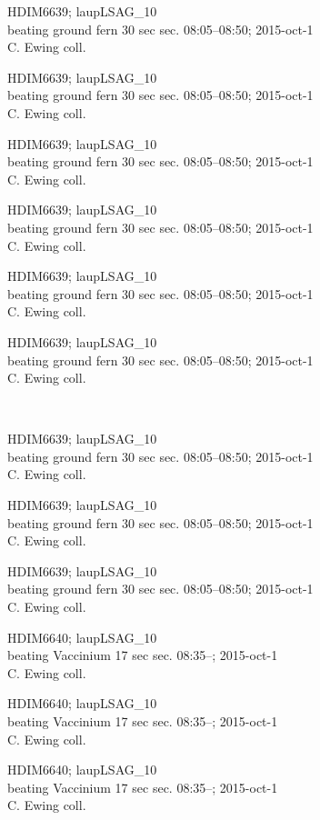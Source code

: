 \documentclass[2pt]{extarticle}
\begin{document}
\noindent
\parbox{0.16\textwidth}{\tiny \raggedright \rule[-0.3\baselineskip]{0pt}{10pt}HDIM6639; laupLSAG\_10\\ beating ground fern 30 sec sec. 08:05--08:50; 2015-oct-1\\ C. Ewing coll.}
\parbox{0.16\textwidth}{\tiny \raggedright \rule[-0.3\baselineskip]{0pt}{10pt}HDIM6639; laupLSAG\_10\\ beating ground fern 30 sec sec. 08:05--08:50; 2015-oct-1\\ C. Ewing coll.}
\parbox{0.16\textwidth}{\tiny \raggedright \rule[-0.3\baselineskip]{0pt}{10pt}HDIM6639; laupLSAG\_10\\ beating ground fern 30 sec sec. 08:05--08:50; 2015-oct-1\\ C. Ewing coll.}
\parbox{0.16\textwidth}{\tiny \raggedright \rule[-0.3\baselineskip]{0pt}{10pt}HDIM6639; laupLSAG\_10\\ beating ground fern 30 sec sec. 08:05--08:50; 2015-oct-1\\ C. Ewing coll.}
\parbox{0.16\textwidth}{\tiny \raggedright \rule[-0.3\baselineskip]{0pt}{10pt}HDIM6639; laupLSAG\_10\\ beating ground fern 30 sec sec. 08:05--08:50; 2015-oct-1\\ C. Ewing coll.}
\parbox{0.16\textwidth}{\tiny \raggedright \rule[-0.3\baselineskip]{0pt}{10pt}HDIM6639; laupLSAG\_10\\ beating ground fern 30 sec sec. 08:05--08:50; 2015-oct-1\\ C. Ewing coll.} \\ 
\vspace{0.001in} 

\noindent
\parbox{0.16\textwidth}{\tiny \raggedright \rule[-0.3\baselineskip]{0pt}{10pt}HDIM6639; laupLSAG\_10\\ beating ground fern 30 sec sec. 08:05--08:50; 2015-oct-1\\ C. Ewing coll.}
\parbox{0.16\textwidth}{\tiny \raggedright \rule[-0.3\baselineskip]{0pt}{10pt}HDIM6639; laupLSAG\_10\\ beating ground fern 30 sec sec. 08:05--08:50; 2015-oct-1\\ C. Ewing coll.}
\parbox{0.16\textwidth}{\tiny \raggedright \rule[-0.3\baselineskip]{0pt}{10pt}HDIM6639; laupLSAG\_10\\ beating ground fern 30 sec sec. 08:05--08:50; 2015-oct-1\\ C. Ewing coll.}
\parbox{0.16\textwidth}{\tiny \raggedright \rule[-0.3\baselineskip]{0pt}{10pt}HDIM6640; laupLSAG\_10\\ beating Vaccinium 17 sec sec. 08:35--; 2015-oct-1\\ C. Ewing coll.}
\parbox{0.16\textwidth}{\tiny \raggedright \rule[-0.3\baselineskip]{0pt}{10pt}HDIM6640; laupLSAG\_10\\ beating Vaccinium 17 sec sec. 08:35--; 2015-oct-1\\ C. Ewing coll.}
\parbox{0.16\textwidth}{\tiny \raggedright \rule[-0.3\baselineskip]{0pt}{10pt}HDIM6640; laupLSAG\_10\\ beating Vaccinium 17 sec sec. 08:35--; 2015-oct-1\\ C. Ewing coll.} \\ 
\vspace{0.001in} 
\end{document}
